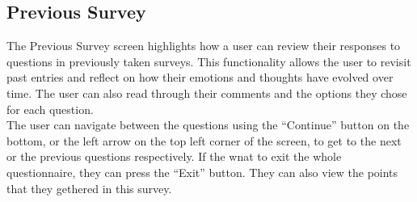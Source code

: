 \vspace{5mm}

\subsection{Previous Survey}

The Previous Survey screen highlights how a user can review their responses to questions in previously taken surveys. This functionality allows the user to revisit past entries and reflect on how their emotions and thoughts have evolved over time. The user can also read through their comments and the options they chose for each question.\vspace{5mm} \\
The user can navigate between the questions using the ``Continue'' button on the bottom, or the left arrow on the top left corner of the screen, to get to the next or the previous questions respectively. If the wnat to exit the whole questionnaire, they can press the ``Exit'' button. They can also view the points that they gethered in this survey.

\vspace{5mm}

